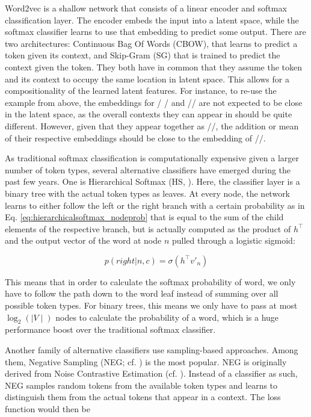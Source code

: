 \documentclass[6pt]{article}
\begin{document}
Word2vec is a shallow network that consists of a linear encoder and softmax classification layer. The encoder embeds the input into a latent space, while the softmax classifier learns to use that embedding to predict some output. There are two architectures: Continuous Bag Of Words (CBOW), that learns to predict a token given its context, and Skip-Gram (SG) that is trained to predict the context given the token. They both have in common that they assume the token and its context to occupy the same location in latent space. This allows for a compositionality of the learned latent features. For instance, to re-use the example from above, the embeddings for / / and // are not expected to be close in the latent space, as the overall contexts they can appear in should be quite different. However, given that they appear together as //, the addition or mean of their respective embeddings should be close to the embedding of //.

As traditional softmax classification is computationally expensive given a larger number of token types, several alternative classifiers have emerged during the past few years. One is Hierarchical Softmax (HS, \cite{morin2005hierarchical}). Here, the classifier layer is a binary tree with the actual token types as leaves. At every node, the network learns to either follow the left or the right branch with a certain probability as in Eq. \ref{eq:hierarchicalsoftmax_nodeprob} that is equal to the sum of the child elements of the respective  branch, but is actually computed as the product of $h^\top$ and the output vector of the word at node $n$ pulled through a logistic sigmoid:

\begin{equation}
p(right|n,c) = \sigma(h^\top v'_n) 
\label{eq:hierarchicalsoftmax_nodeprob}
\end{equation}

This means that in order to calculate the softmax probability of word, we only have to follow the path down to the word leaf instead of summing over all possible token types. For binary trees, this means we only have to pass at most $\log_2(\mid V\mid)$ nodes to calculate the probability of a word, which is a huge performance boost over the traditional softmax classifier. 

Another family of alternative classifiers use sampling-based approaches. Among them, Negative Sampling (NEG; cf. \cite{goldberg2014word2vec}) is the most popular. NEG is originally derived from Noise Contrastive Estimation (cf. \cite{gutmann2010noise,mnih2012fast}). Instead of a classifier as such, NEG samples random tokens from the available token types and learns to distinguish them from the actual tokens that appear in a context. The loss function would then be
\end{document}
